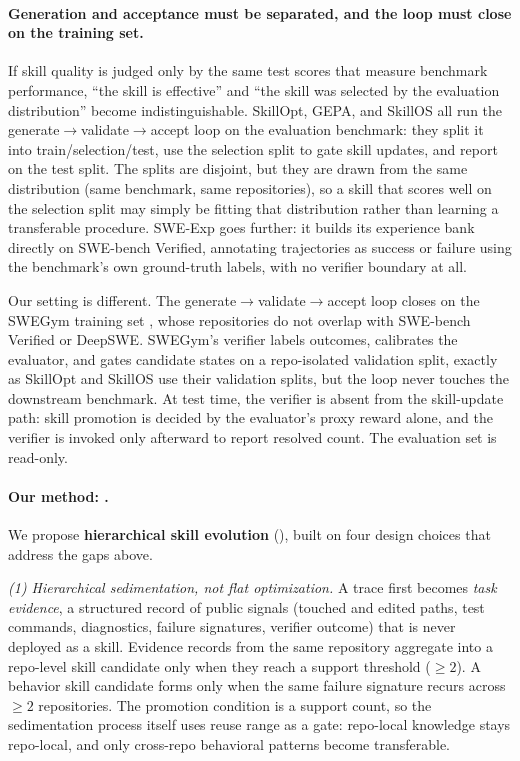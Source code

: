 \paragraph{Generation and acceptance must be separated, and the loop must close
on the training set.}
If skill quality is judged only by the same test scores that measure benchmark
performance, ``the skill is effective'' and ``the skill was selected by the
evaluation distribution'' become indistinguishable. SkillOpt, GEPA, and SkillOS
all run the generate$\to$validate$\to$accept loop on the evaluation benchmark:
they split it into train/selection/test, use the selection split to gate skill
updates, and report on the test split. The splits are disjoint, but they are
drawn from the same distribution (same benchmark, same repositories), so a
skill that scores well on the selection split may simply be fitting that
distribution rather than learning a transferable procedure. SWE-Exp
\citep{sweexp2025} goes further: it builds its experience bank directly on
SWE-bench Verified, annotating trajectories as success or failure using the
benchmark's own ground-truth labels, with no verifier boundary at all.

Our setting is different. The generate$\to$validate$\to$accept loop closes on
the SWEGym training set \citep{swegym2025}, whose repositories do not overlap
with SWE-bench Verified or DeepSWE. SWEGym's verifier labels outcomes,
calibrates the evaluator, and gates candidate states on a repo-isolated
validation split, exactly as SkillOpt and SkillOS use their validation splits,
but the loop never touches the downstream benchmark. At test time, the
verifier is absent from the skill-update path: skill promotion is decided by
the evaluator's proxy reward alone, and the verifier is invoked only
afterward to report resolved count. The evaluation set is read-only.

\paragraph{Our method: \method{}.}
We propose \textbf{hierarchical skill evolution} (\method{}), built on four
design choices that address the gaps above.

\emph{(1) Hierarchical sedimentation, not flat optimization.} A trace first
becomes \emph{task evidence}, a structured record of public signals (touched
and edited paths, test commands, diagnostics, failure signatures, verifier
outcome) that is never deployed as a skill. Evidence records from the same
repository aggregate into a repo-level skill candidate only when they reach a
support threshold ($\geq 2$). A behavior skill candidate forms only when the
same failure signature recurs across $\geq 2$ repositories. The promotion
condition is a support count, so the sedimentation process itself uses reuse
range as a gate: repo-local knowledge stays repo-local, and only cross-repo
behavioral patterns become transferable.

